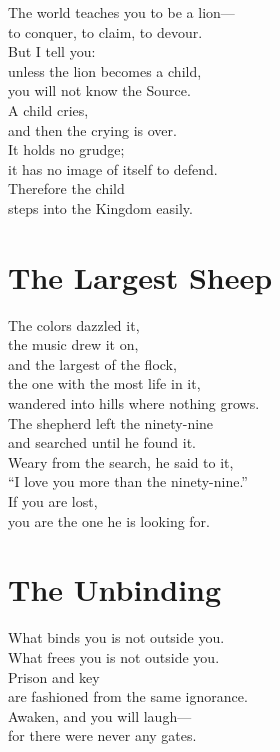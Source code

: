 \documentclass[10pt, openright]{book}
\newcommand{\sectionbreak}{\filbreak}
\newcommand{\sayingsource}[1]{\par\nopagebreak\vspace{0.3\baselineskip}{\raggedleft\footnotesize\itshape #1\par}}
\begin{document}
The world teaches you to be a lion---\\
to conquer, to claim, to devour.\\
But I tell you:\\
unless the lion becomes a child,\\
you will not know the Source.\\
A child cries,\\
and then the crying is over.\\
It holds no grudge;\\
it has no image of itself to defend.\\
Therefore the child\\
steps into the Kingdom easily.

\sayingsource{Thomas 7, 22}

\sectionbreak

\section{The Largest Sheep}\label{the-largest-sheep}

The colors dazzled it,\\
the music drew it on,\\
and the largest of the flock,\\
the one with the most life in it,\\
wandered into hills where nothing grows.\\
The shepherd left the ninety-nine\\
and searched until he found it.\\
Weary from the search, he said to it,\\
``I love you more than the ninety-nine.''\\
If you are lost,\\
you are the one he is looking for.

\sayingsource{Tao Te Ching 12 · Thomas 107}

\sectionbreak

\section{The Unbinding}\label{the-unbinding}

What binds you is not outside you.\\
What frees you is not outside you.\\
Prison and key\\
are fashioned from the same ignorance.\\
Awaken, and you will laugh---\\
for there were never any gates.
\end{document}
